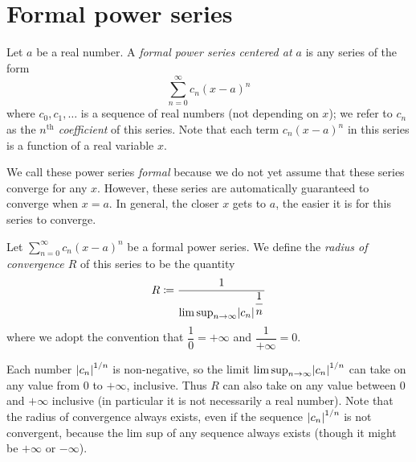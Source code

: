 \section{Formal power series}\label{sec:4.1}

\begin{defn}\label{4.1.1}
  Let \(a\) be a real number.
  A \emph{formal power series centered at \(a\)} is any series of the form
  \[
    \sum_{n = 0}^\infty c_n (x - a)^n
  \]
  where \(c_0, c_1, \dots\) is a sequence of real numbers (not depending on \(x\));
  we refer to \(c_n\) as the \emph{\(n^{\text{th}}\) coefficient} of this series.
  Note that each term \(c_n (x - a)^n\) in this series is a function of a real variable \(x\).
\end{defn}

\begin{note}
  We call these power series \emph{formal} because we do not yet assume that these series converge for any \(x\).
  However, these series are automatically guaranteed to converge when \(x = a\).
  In general, the closer \(x\) gets to \(a\), the easier it is for this series to converge.
\end{note}

\setcounter{thm}{2}
\begin{defn}\label{4.1.3}
  Let \(\sum_{n = 0}^\infty c_n (x - a)^n\) be a formal power series.
  We define the \emph{radius of convergence \(R\)} of this series to be the quantity
  \[
    R \coloneqq \dfrac{1}{\limsup_{n \to \infty} \abs{c_n}^{\dfrac{1}{n}}}
  \]
  where we adopt the convention that \(\dfrac{1}{0} = +\infty\) and \(\dfrac{1}{+\infty} = 0\).
\end{defn}

\begin{rmk}\label{4.1.4}
  Each number \(\left\lvert c_n\right\rvert^{1 / n}\) is non-negative, so the limit \(\limsup_{n \to \infty} \abs{c_n}^{1 / n}\) can take on any value from \(0\) to \(+\infty\), inclusive.
  Thus \(R\) can also take on any value between \(0\) and \(+\infty\) inclusive
  (in particular it is not necessarily a real number).
  Note that the radius of convergence always exists, even if the sequence \(\left\lvert c_n\right\rvert^{1 / n}\) is not convergent, because the lim sup of any sequence always exists
  (though it might be \(+\infty\) or \(-\infty\)).
\end{rmk}

